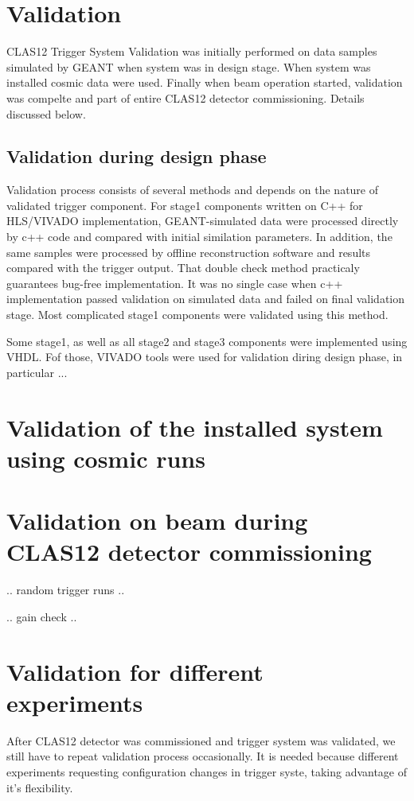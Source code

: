 \section{Validation}

CLAS12 Trigger System Validation was initially performed on data samples simulated by GEANT when system was in design stage. When system was installed cosmic data were used. Finally when beam operation started, validation was compelte and part of entire CLAS12 detector commissioning. Details discussed below.

\subsection{Validation during design phase}

Validation process consists of several methods and depends on the nature of validated trigger component. For stage1 components written on C++ for HLS/VIVADO implementation, GEANT-simulated data were processed directly by c++ code and compared with initial similation parameters. In addition, the same samples were processed by offline reconstruction software and results compared with the trigger output. That double check method practicaly guarantees bug-free implementation. It was no single case when c++ implementation passed validation on simulated data and failed on final validation stage. Most complicated stage1 components were validated using this method.

Some stage1, as well as all stage2 and stage3 components were implemented using VHDL. Fof those, VIVADO tools were used for validation diring design phase, in particular ...

\section{Validation of the installed system using cosmic runs}

\section{Validation on beam during CLAS12 detector commissioning}

.. random trigger runs ..

.. gain check ..


\section{Validation for different experiments}

After CLAS12 detector was commissioned and trigger system was validated, we still have to repeat validation process occasionally. It is needed because different experiments requesting configuration changes in trigger syste, taking advantage of it's flexibility.